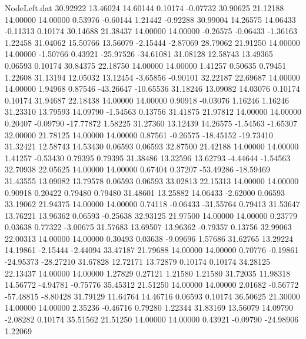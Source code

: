 \begin{filecontents}{NodeLeft.dat}
  30.92922   13.46024   14.60144     0.10174   -0.07732   30.90625   21.12188   14.00000   14.00000    0.53976   -0.60144    1.21442   -0.92288
  30.99004   14.26575   14.06433    -0.11313    0.10174   30.14688   21.38437   14.00000   14.00000   -0.26575   -0.06433   -1.36163    1.22458
  31.04062   15.50766   13.56079    -2.15444   -2.87069   28.79062   21.91250   14.00000   14.00000   -1.50766    0.43921  -25.97526  -34.61081
  31.08128   12.58743   13.49365     0.06593    0.10174   30.84375   22.18750   14.00000   14.00000    1.41257    0.50635    0.79451    1.22608
  31.13194   12.05032   13.12454    -3.65856   -0.90101   32.22187   22.69687   14.00000   14.00000    1.94968    0.87546  -43.26647  -10.65536
  31.18246   13.09082   14.03076     0.10174    0.10174   31.94687   22.18438   14.00000   14.00000    0.90918   -0.03076    1.16246    1.16246
  31.23310   13.79593   14.09790    -1.54563    0.13756   31.41875   21.97812   14.00000   14.00000    0.20407   -0.09790  -17.77872    1.58225
  31.27360   13.12439   14.26575    -1.54563   -1.65307   32.00000   21.78125   14.00000   14.00000    0.87561   -0.26575  -18.45152  -19.73410
  31.32421   12.58743   14.53430     0.06593    0.06593   32.87500   21.42188   14.00000   14.00000    1.41257   -0.53430    0.79395    0.79395
  31.38486   13.32596   13.62793    -4.44644   -1.54563   32.70938   22.05625   14.00000   14.00000    0.67404    0.37207  -53.49286  -18.59469
  31.43555   13.09082   13.79578     0.06593    0.06593   33.02813   22.15313   14.00000   14.00000    0.90918    0.20422    0.79480    0.79480
  31.48601   13.25882   14.06433    -2.62000    0.06593   33.19062   21.94375   14.00000   14.00000    0.74118   -0.06433  -31.55764    0.79413
  31.53647   13.76221   13.96362     0.06593   -0.25638   32.93125   21.97500   14.00000   14.00000    0.23779    0.03638    0.77322   -3.00675
  31.57683   13.69507   13.96362    -0.79357    0.13756   32.99063   22.00313   14.00000   14.00000    0.30493    0.03638   -9.09696    1.57686
  31.62765   13.29224   14.19861    -2.15444   -2.44094   33.47187   21.79688   14.00000   14.00000    0.70776   -0.19861  -24.95373  -28.27210
  31.67828   12.72171   13.72879     0.10174    0.10174   34.28125   22.13437   14.00000   14.00000    1.27829    0.27121    1.21580    1.21580
  31.72035   11.98318   14.56772    -4.94781   -0.75776   35.45312   21.51250   14.00000   14.00000    2.01682   -0.56772  -57.48815   -8.80428
  31.79129   11.64764   14.46716     0.06593    0.10174   36.50625   21.30000   14.00000   14.00000    2.35236   -0.46716    0.79280    1.22344
  31.83169   13.56079   14.09790    -2.08282    0.10174   35.51562   21.51250   14.00000   14.00000    0.43921   -0.09790  -24.98906    1.22069

\end{filecontents}
